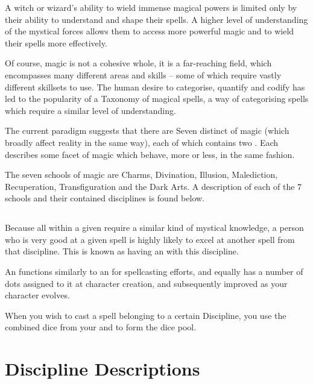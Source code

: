 A witch or wizard's ability to wield immense magical powers is limited only by their ability to understand and shape their spells. A higher level of understanding of the mystical forces allows them to access more powerful magic and to wield their spells more effectively. 

Of course, magic is not a cohesive whole, it is a far-reaching field, which encompasses many different areas and skills -- some of which require vastly different skillsets to use. The human desire to categorise, quantify and codify has led to the popularity of a Taxonomy of magical spells, a way of categorising spells which require a similar level of understanding. 

The current paradigm suggests that there are Seven distinct  of magic (which broadly affect reality in the same way), each of which contains two . Each  describes some facet of magic which behave, more or less, in the same fashion.

The seven schools of magic are Charms, Divination, Illusion, Malediction, Recuperation, Transfiguration and the Dark Arts. A description of each of the 7 schools and their contained disciplines is found below.

\subsection{}

Because all  within a given  require a similar kind of mystical knowledge, a person who is very good at a given  spell is highly likely to excel at another spell from that discipline. This is known as having an  with this discipline. 

An  functions similarly to an  for spellcasting efforts, and equally has a number of dots assigned to it at character creation, and subsequently improved as your character evolves. 

When you wish to cast a spell belonging to a certain Discipline, you use the combined dice from your  and  to form the dice pool. 



\section{Discipline Descriptions}\label{S:DiscDescs}

